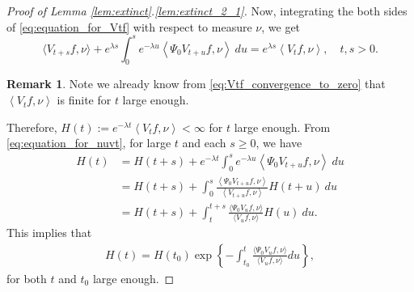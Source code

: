 \documentclass[12pt,a4paper]{amsart}
\numberwithin{equation}{section}
\theoremstyle{plain}
\theoremstyle{definition}
\newtheorem{rem}[thm]{Remark}
\begin{document}
\begin{proof}[Proof of Lemma \ref{lem:extinct}.\eqref{lem:extinct_2_1}]
Now,  integrating the both sides of \eqref{eq:equation_for_Vtf} with respect to measure $\nu$, we get
\begin{equation}
\label{eq:equation_for_nuvt}
\langle V_{t+s}f, \nu\rangle + e^{\lambda s}\int_0^s e^{-\lambda u}\left\langle \Psi_0 V_{t+u} f,\nu\right\rangle~du
= e^{\lambda s}\left\langle V_tf,\nu \right\rangle,
\quad t,s > 0.
\end{equation}  
\begin{rem}
\label{rem:Vtfnu_is_finite_when_t_is_large}
Note we already know from \eqref{eq:Vtf_convergence_to_zero} that $\left\langle V_tf,\nu \right\rangle$ is finite for $t$ large enough.
\end{rem}
Therefore, $H(t):=e^{-\lambda t}\left\langle V_tf,\nu \right\rangle<\infty$ for $t$ large enough.
From \eqref{eq:equation_for_nuvt}, for large $t$ and each $s\geq 0$, we have 
\begin{align}
H(t)
&= H(t+s) + e^{-\lambda t}\int_0^{s} e^{-\lambda u} \left\langle\Psi_0 V_{t+u}f,\nu\right\rangle~du
\\&=H(t+s) + \int_0^{s}  \frac{\left\langle\Psi_0 V_{t+u} f,\nu\right\rangle}{ \left\langle V_{t+u} f,\nu \right\rangle } H(t+u)~du   
\\&=H(t+s) + \int_t^{t+s}\frac{\langle\Psi_0 V_uf,\nu\rangle}{\langle V_uf,\nu\rangle}H(u)~du. 
\end{align}
This implies that 
\begin{align}
\label{eq:Ht}
H(t)
=H(t_0) \exp\left\{-\int_{t_0}^t\frac{\langle\Psi_0 V_uf,\nu\rangle}{\langle V_uf,\nu\rangle}du\right\},
\end{align}
for both $t$ and $t_0$ large enough.  


\end{proof}
\end{document}
